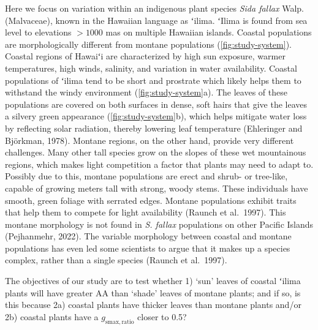 \documentclass[
  letterpaper,
  DIV=11,
  numbers=noendperiod]{scrartcl}
\begin{document}
Here we focus on variation within an indigenous plant species \emph{Sida
fallax} Walp. (Malvaceae), known in the Hawaiian language as ʻilima.
ʻIlima is found from sea level to elevations \(>1000\) mas on multiple
Hawaiian islands. Coastal populations are morphologically different from
montane populations (\autoref{fig:study-system}). Coastal regions of
Hawaiʻi are characterized by high sun exposure, warmer temperatures,
high winds, salinity, and variation in water availability. Coastal
populations of ʻilima tend to be short and prostrate which likely helps
them to withstand the windy environment (\autoref{fig:study-system}a).
The leaves of these populations are covered on both surfaces in dense,
soft hairs that give the leaves a silvery green appearance
(\autoref{fig:study-system}b), which helps mitigate water loss by
reflecting solar radiation, thereby lowering leaf temperature
(Ehleringer and Björkman, 1978). Montane regions, on the other hand,
provide very different challenges. Many other tall species grow on the
slopes of these wet mountainous regions, which makes light competition a
factor that plants may need to adapt to. Possibly due to this, montane
populations are erect and shrub- or tree-like, capable of growing meters
tall with strong, woody stems. These individuals have smooth, green
foliage with serrated edges. Montane populations exhibit traits that
help them to compete for light availability (Raunch et al.~1997). This
montane morphology is not found in \emph{S. fallax} populations on other
Pacific Islands (Pejhanmehr, 2022). The variable morphology between
coastal and montane populations has even led some scientists to argue
that it makes up a species complex, rather than a single species (Raunch
et al.~1997).

The objectives of our study are to test whether 1) `sun' leaves of
coastal ʻilima plants will have greater \(\mathrm{AA}\) than `shade'
leaves of montane plants; and if so, is this because 2a) coastal plants
have thicker leaves than montane plants and/or 2b) coastal plants have a
\(g_{\mathrm{smax,ratio}}\) closer to 0.5?
\end{document}
